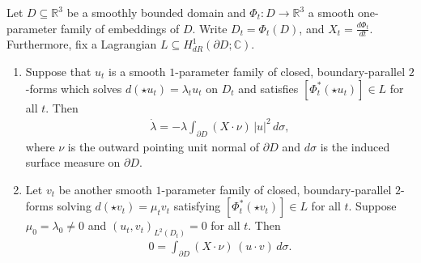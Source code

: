 \documentclass[10pt,a4paper]{amsart}
\begin{document}
\begin{theorem}
\label{thm:hadamard_rule}
Let $D \subseteq \mathbb R^3$ be a smoothly bounded domain and $\Phi_t: D \to \mathbb R^3$ a smooth one-parameter family of embeddings of $D$. Write $D_t = \Phi_t (D)$, and $X_t = \frac{d\Phi_t}{dt}$. Furthermore, fix a Lagrangian $L \subseteq H^1_{dR}(\partial D;\mathbb C)$.
\begin{enumerate}[label=(\alph*)]
    \item Suppose that $u_t$ is a smooth $1$-parameter family of closed, boundary-parallel $2$-forms which solves $d ( \star u_t ) = \lambda_t u_t$ on $D_t$ and satisfies $[\Phi_t^\ast ( \star u_t)] \in L$ for all $t$.
    Then
    \begin{align}
        \Dot{\lambda} = - \lambda \int_{\partial D} (X \cdot \nu) \, |u|^2\, d\sigma,
    \end{align}
    where $\nu$ is the outward pointing unit normal of $\partial D$ and $d\sigma$ is the induced surface measure on $\partial D$.
    \item Let $v_t$ be another smooth $1$-parameter family of closed, boundary-parallel $2$-forms solving $d ( \star v_t ) = \mu_t v_t$ satisfying $[\Phi_t^\ast ( \star v_t)] \in L$ for all $t$. Suppose $\mu_0 = \lambda_0 \neq 0$ and $\left( u_t,v_t\right)_{L^2(D_t)} = 0$ for all $t$. Then 
    \begin{align}
        0 = \int_{\partial D} (X \cdot \nu) \, (u \cdot v) \, d\sigma.
    \end{align}
\end{enumerate}
\end{theorem}
\end{document}
